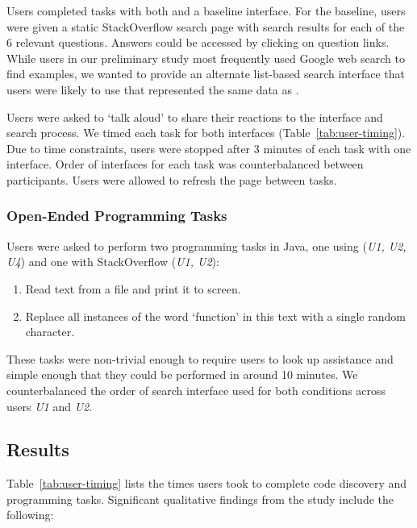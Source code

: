 Users completed tasks with both \systemname{} and a baseline interface.
For the baseline, users were given a static StackOverflow search page with search results for each of the 6 relevant questions.
Answers could be accessed by clicking on question links.
While users in our preliminary study most frequently used Google web search to find examples, we wanted to provide an alternate list-based search interface that users were likely to use that represented the same data as \systemname{}.

Users were asked to `talk aloud' to share their reactions to the interface and search process.
We timed each task for both interfaces (Table~\ref{tab:user-timing}).
Due to time constraints, users were stopped after 3 minutes of each task with one interface.
Order of interfaces for each task was counterbalanced between participants.
Users were allowed to refresh the page between tasks.

\subsubsection{Open-Ended Programming Tasks}

Users were asked to perform two programming tasks in Java, one using \systemname{} (\emph{U1, U2, U4}) and one with StackOverflow (\emph{U1, U2}):
\begin{enumerate}[noitemsep]
\item Read text from a file and print it to screen.
\item Replace all instances of the word `function' in this text with a single random character.
\end{enumerate}
These tasks were non-trivial enough to require users to look up assistance and simple enough that they could be performed in around 10 minutes.
We counterbalanced the order of search interface used for both conditions across users \emph{U1} and \emph{U2}.

\subsection{Results}

Table~\ref{tab:user-timing} lists the times users took to complete code discovery and programming tasks. 
Significant qualitative findings from the study include the following:

